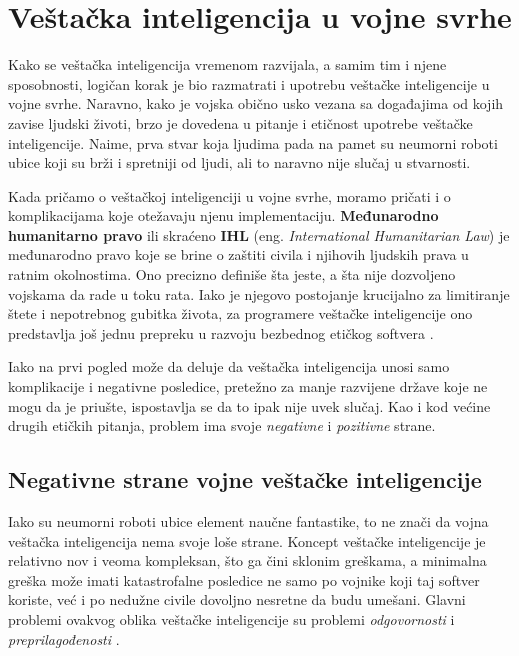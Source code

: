 \documentclass[a4paper]{article}
\begin{document}


\section{Veštačka inteligencija u vojne svrhe}
\label{sec: AI korišćen u vojne svrhe}
Kako se veštačka inteligencija vremenom razvijala, a samim tim i njene sposobnosti, logičan korak je bio razmatrati i upotrebu veštačke inteligencije u vojne svrhe. Naravno, kako je vojska obično usko vezana sa događajima od kojih zavise ljudski životi, brzo je dovedena u pitanje i etičnost upotrebe veštačke inteligencije. Naime, prva stvar koja ljudima pada na pamet su neumorni roboti ubice koji su brži i spretniji od ljudi, ali to naravno nije slučaj u stvarnosti.

Kada pričamo o veštačkoj inteligenciji u vojne svrhe, moramo pričati i o komplikacijama koje otežavaju njenu implementaciju. \textbf{Međunarodno humanitarno pravo} ili skraćeno \textbf{IHL} (eng. \textit{International Humanitarian Law}) je međunarodno pravo koje se brine o zaštiti civila i njihovih ljudskih prava u ratnim okolnostima. Ono precizno definiše šta jeste, a šta nije dozvoljeno vojskama da rade u toku rata. Iako je njegovo postojanje krucijalno za limitiranje štete i nepotrebnog gubitka života, za programere veštačke inteligencije ono predstavlja još jednu prepreku u razvoju bezbednog etičkog softvera \cite{ihl}.

Iako na prvi pogled može da deluje da veštačka inteligencija unosi samo komplikacije i negativne posledice, pretežno za manje razvijene države koje ne mogu da je priušte, ispostavlja se da to ipak nije uvek slučaj. Kao i kod većine drugih etičkih pitanja, problem ima svoje \emph{negativne} i \emph{pozitivne} strane.
\subsection{Negativne strane vojne veštačke inteligencije}
\label{subsec: Negativne strane vojne veštačke inteligencije}
Iako su neumorni roboti ubice element naučne fantastike, to ne znači da vojna veštačka inteligencija nema svoje loše strane. Koncept veštačke inteligencije je relativno nov i veoma kompleksan, što ga čini sklonim greškama, a minimalna greška može imati katastrofalne posledice ne samo po vojnike koji taj softver koriste, već i po nedužne civile dovoljno nesretne da budu umešani. Glavni problemi ovakvog oblika veštačke inteligencije su problemi \emph{odgovornosti} i \emph{preprilagođenosti} \cite{military_ai_problems}.
\end{document}

